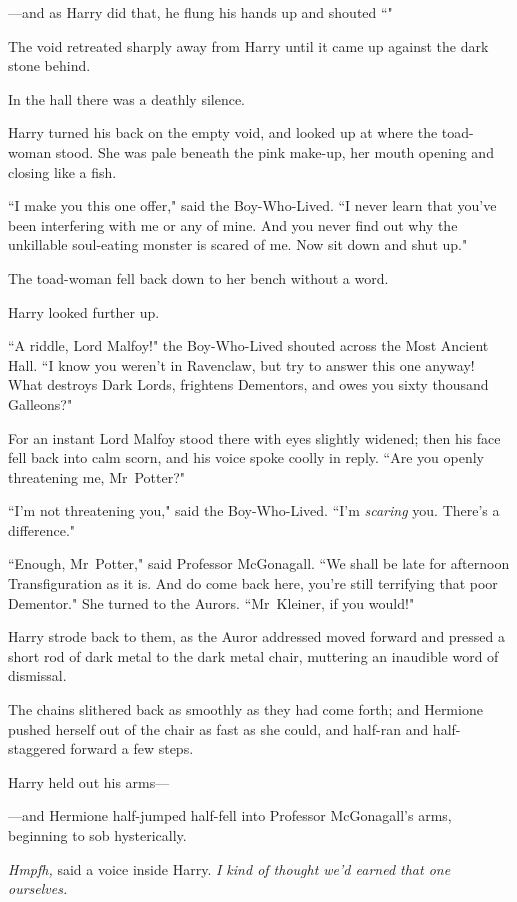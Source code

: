 —and as Harry did that, he flung his hands up and shouted ``"

The void retreated sharply away from Harry until it came up against the dark stone behind.

In the hall there was a deathly silence.

Harry turned his back on the empty void, and looked up at where the toad-woman stood. She was pale beneath the pink make-up, her mouth opening and closing like a fish.

``I make you this one offer," said the Boy-Who-Lived. ``I never learn that you've been interfering with me or any of mine. And you never find out why the unkillable soul-eating monster is scared of me. Now sit down and shut up."

The toad-woman fell back down to her bench without a word.

Harry looked further up.

``A riddle, Lord Malfoy!" the Boy-Who-Lived shouted across the Most Ancient Hall. ``I know you weren't in Ravenclaw, but try to answer this one anyway! What destroys Dark Lords, frightens Dementors, and owes you sixty thousand Galleons?"

For an instant Lord Malfoy stood there with eyes slightly widened; then his face fell back into calm scorn, and his voice spoke coolly in reply. ``Are you openly threatening me, Mr~Potter?"

``I'm not threatening you," said the Boy-Who-Lived. ``I'm \emph{scaring} you. There's a difference."

``Enough, Mr~Potter," said Professor McGonagall. ``We shall be late for afternoon Transfiguration as it is. And do come back here, you're still terrifying that poor Dementor." She turned to the Aurors. ``Mr~Kleiner, if you would!"

Harry strode back to them, as the Auror addressed moved forward and pressed a short rod of dark metal to the dark metal chair, muttering an inaudible word of dismissal.

The chains slithered back as smoothly as they had come forth; and Hermione pushed herself out of the chair as fast as she could, and half-ran and half-staggered forward a few steps.

Harry held out his arms—

—and Hermione half-jumped half-fell into Professor McGonagall's arms, beginning to sob hysterically.

\emph{Hmpfh,} said a voice inside Harry. \emph{I kind of thought we'd earned that one ourselves.}

